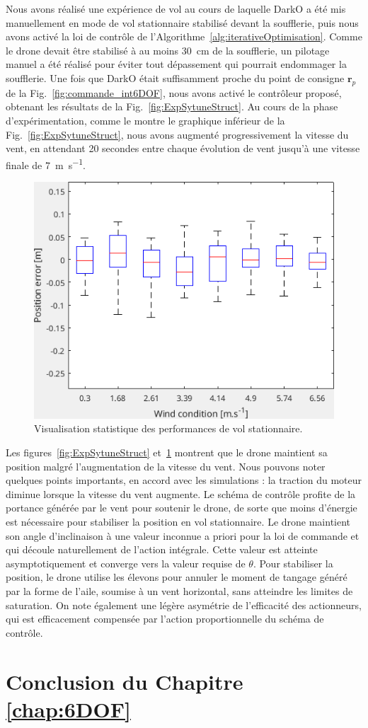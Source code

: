 Nous avons réalisé une expérience de vol au cours de laquelle DarkO a été mis manuellement en mode de vol stationnaire stabilisé devant la soufflerie, puis nous avons activé la loi de contrôle de l'Algorithme~\ref{alg:iterativeOptimisation}. Comme le drone devait être stabilisé à au moins \SI{30}{\centi\meter} de la soufflerie, un pilotage manuel a été réalisé pour éviter tout dépassement qui pourrait endommager la soufflerie. Une fois que DarkO était suffisamment proche du point de consigne $\boldsymbol{r}_{p}$ de la Fig.~\ref{fig:commande_int6DOF}, nous avons activé le contrôleur proposé, obtenant les résultats de la Fig.~\ref{fig:ExpSytuneStruct}. Au cours de la phase d'expérimentation, comme le montre le graphique inférieur de la Fig.~\ref{fig:ExpSytuneStruct}, nous avons augmenté progressivement la vitesse du vent, en attendant 20 secondes entre chaque évolution de vent jusqu'à une vitesse finale de \SI{7}{\meter\per\second}.


\begin{figure}[ht!]
    \centering
    \includegraphics[trim=0cm 0cm 0cm 0cm,clip,width=0.6\columnwidth]{figures/boxplot.png}
    \caption{Visualisation statistique des performances de vol stationnaire.}
    \label{fig:statpos}
\end{figure}

Les figures~\ref{fig:ExpSytuneStruct} et~\ref{fig:statpos} montrent que le drone maintient sa position malgré l'augmentation de la vitesse du vent. Nous pouvons noter quelques points importants, en accord avec les simulations : la traction du moteur diminue lorsque la vitesse du vent augmente. Le schéma de contrôle profite de la portance générée par le vent pour soutenir le drone, de sorte que moins d'énergie est nécessaire pour stabiliser la position en vol stationnaire. Le drone maintient son angle d'inclinaison à une valeur inconnue a priori pour la loi de commande et qui découle naturellement de l'action intégrale. Cette valeur est atteinte asymptotiquement et converge vers la valeur requise de $\theta$. Pour stabiliser la position, le drone utilise les élevons pour annuler le moment de tangage généré par la forme de l'aile, soumise à un vent horizontal, sans atteindre les limites de saturation.
On note également une légère asymétrie de l'efficacité des actionneurs, qui est efficacement compensée par l'action proportionnelle du schéma de contrôle.


\section{Conclusion du Chapitre \ref{chap:6DOF}}




